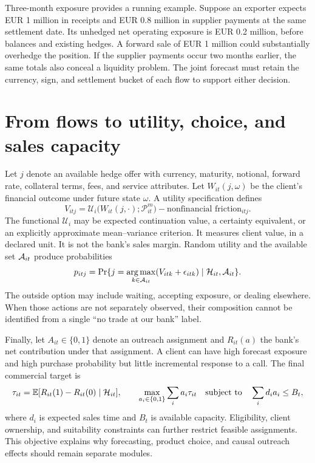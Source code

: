 Three-month exposure provides a running example. Suppose an exporter expects EUR 1 million in receipts and EUR 0.8 million in supplier payments at the same settlement date. Its unhedged net operating exposure is EUR 0.2 million, before balances and existing hedges. A forward sale of EUR 1 million could substantially overhedge the position. If the supplier payments occur two months earlier, the same totals also conceal a liquidity problem. The joint forecast must retain the currency, sign, and settlement bucket of each flow to support either decision.

\section{From flows to utility, choice, and sales capacity}
Let $j$ denote an available hedge offer with currency, maturity, notional, forward rate, collateral terms, fees, and service attributes. Let $W_{it}(j,\omega)$ be the client's financial outcome under future state $\omega$. A utility specification defines
\begin{equation}
V_{itj}=\mathcal U_i\bigl(W_{it}(j,\cdot);\mathcal P_{it}^{m}\bigr)
           -\text{nonfinancial friction}_{itj}.
\label{eq:valueintro}
\end{equation}
The functional $\mathcal U_i$ may be expected continuation value, a certainty equivalent, or an explicitly approximate mean--variance criterion. It measures client value, in a declared unit. It is not the bank's sales margin. Random utility and the available set $\mathcal A_{it}$ produce probabilities
\begin{equation}
p_{itj}=\Pr\{j=\operatorname*{arg\,max}_{k\in\mathcal A_{it}}(V_{itk}+\epsilon_{itk})
                 \mid\mathcal H_{it},\mathcal A_{it}\}.
\end{equation}
The outside option may include waiting, accepting exposure, or dealing elsewhere. When those actions are not separately observed, their composition cannot be identified from a single ``no trade at our bank'' label.

Finally, let $A_{it}\in\{0,1\}$ denote an outreach assignment and $R_{it}(a)$ the bank's net contribution under that assignment. A client can have high forecast exposure and high purchase probability but little incremental response to a call. The final commercial target is
\begin{equation}
\tau_{it}=\mathbb E[R_{it}(1)-R_{it}(0)\mid\mathcal H_{it}],
\qquad
\max_{a_i\in\{0,1\}}\sum_i a_i\tau_{it}
\quad\text{subject to}\quad\sum_i d_i a_i\leq B_t,
\label{eq:capacityintro}
\end{equation}
where $d_i$ is expected sales time and $B_t$ is available capacity. Eligibility, client ownership, and suitability constraints can further restrict feasible assignments. This objective explains why forecasting, product choice, and causal outreach effects should remain separate modules.

